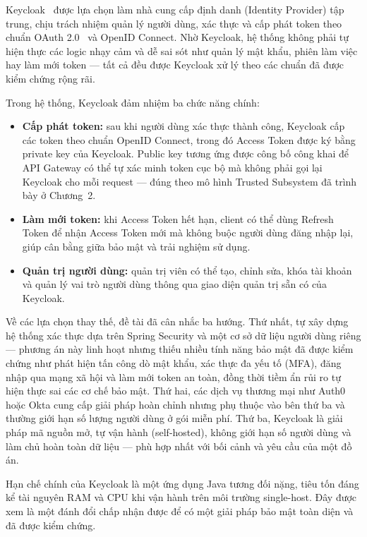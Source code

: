\documentclass[../DoAn.tex]{subfiles}
\begin{document}
Keycloak~\cite{keycloak_docs} được lựa chọn làm nhà cung cấp định danh (Identity Provider)
tập trung, chịu trách nhiệm quản lý người dùng, xác thực và cấp phát token theo chuẩn OAuth
2.0~\cite{rfc6749} và OpenID Connect. Nhờ Keycloak, hệ thống không phải tự hiện thực các
logic nhạy cảm và dễ sai sót như quản lý mật khẩu, phiên làm việc hay làm mới token --- tất
cả đều được Keycloak xử lý theo các chuẩn đã được kiểm chứng rộng rãi.

Trong hệ thống, Keycloak đảm nhiệm ba chức năng chính:

\begin{itemize}[noitemsep]
    \item \textbf{Cấp phát token:} sau khi người dùng xác thực thành công, Keycloak cấp các
          token theo chuẩn OpenID Connect, trong đó Access Token được ký bằng private key của
          Keycloak. Public key tương ứng được công bố công khai để API Gateway có thể tự xác
          minh token cục bộ mà không phải gọi lại Keycloak cho mỗi request --- đúng theo mô
          hình Trusted Subsystem đã trình bày ở Chương~2.
    \item \textbf{Làm mới token:} khi Access Token hết hạn, client có thể dùng Refresh Token
          để nhận Access Token mới mà không buộc người dùng đăng nhập lại, giúp cân bằng giữa
          bảo mật và trải nghiệm sử dụng.
    \item \textbf{Quản trị người dùng:} quản trị viên có thể tạo, chỉnh sửa, khóa tài khoản
          và quản lý vai trò người dùng thông qua giao diện quản trị sẵn có của Keycloak.
\end{itemize}

Về các lựa chọn thay thế, đề tài đã cân nhắc ba hướng. Thứ nhất, tự xây dựng hệ thống xác
thực dựa trên Spring Security và một cơ sở dữ liệu người dùng riêng --- phương án này linh
hoạt nhưng thiếu nhiều tính năng bảo mật đã được kiểm chứng như phát hiện tấn công dò mật
khẩu, xác thực đa yếu tố (MFA), đăng nhập qua mạng xã hội và làm mới token an toàn, đồng thời
tiềm ẩn rủi ro tự hiện thực sai các cơ chế bảo mật. Thứ hai, các dịch vụ thương mại như Auth0
hoặc Okta cung cấp giải pháp hoàn chỉnh nhưng phụ thuộc vào bên thứ ba và thường giới hạn số
lượng người dùng ở gói miễn phí. Thứ ba, Keycloak là giải pháp mã nguồn mở, tự vận hành
(self-hosted), không giới hạn số người dùng và làm chủ hoàn toàn dữ liệu --- phù hợp nhất với
bối cảnh và yêu cầu của một đồ án.

Hạn chế chính của Keycloak là một ứng dụng Java tương đối nặng, tiêu tốn đáng kể tài nguyên
RAM và CPU khi vận hành trên môi trường single-host. Đây được xem là một đánh đổi chấp nhận
được để có một giải pháp bảo mật toàn diện và đã được kiểm chứng.
\end{document}
